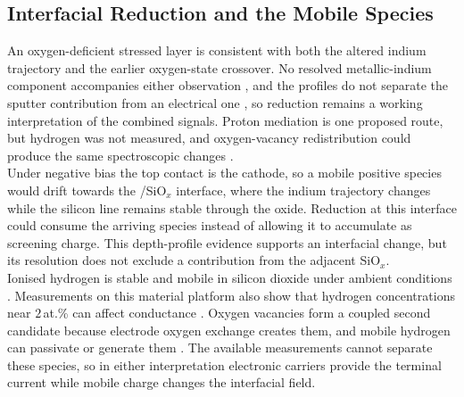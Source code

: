 \FloatBarrier

\subsection[Interfacial Reduction and the Mobile Species]{Interfacial Reduction and the Mobile Species}

\noindent An oxygen-deficient stressed  layer is consistent with both the altered indium trajectory and
the earlier oxygen-state crossover. No resolved metallic-indium component accompanies either observation
\cite{huang2003electrochemical, liu2015important}, and the profiles do not separate the sputter contribution from an
electrical one \cite{oswald2006x}, so reduction remains a working interpretation of the combined signals. Proton
mediation is one proposed route, but hydrogen was not measured, and oxygen-vacancy redistribution could produce the
same spectroscopic changes \cite{lee2019charge, kenyon2019interplay}.\\

\noindent Under negative bias the  top contact is the cathode, so a mobile positive species would drift
towards the /SiO$_x$ interface, where the indium trajectory changes while the silicon line remains stable
through the oxide. Reduction at this interface could consume the arriving species instead of allowing it to
accumulate as screening charge. This depth-profile evidence supports an interfacial change, but its resolution does
not exclude a contribution from the adjacent SiO$_x$.\\

\noindent Ionised hydrogen is stable and mobile in silicon dioxide under ambient conditions
\cite{hofstein1967proton, vanheusden1999non, vanheusden1998thermally}. Measurements on this material platform also
show that hydrogen concentrations near $2$\,at.\% can affect conductance \cite{cox2024hydrogen}. Oxygen vacancies form
a coupled second candidate because electrode oxygen exchange creates them, and mobile hydrogen can passivate or
generate them \cite{cox2024hydrogen, mehonic2017intrinsic}. The available measurements cannot separate these species,
so in either interpretation electronic carriers provide the terminal current while mobile charge changes the
interfacial field.\\

